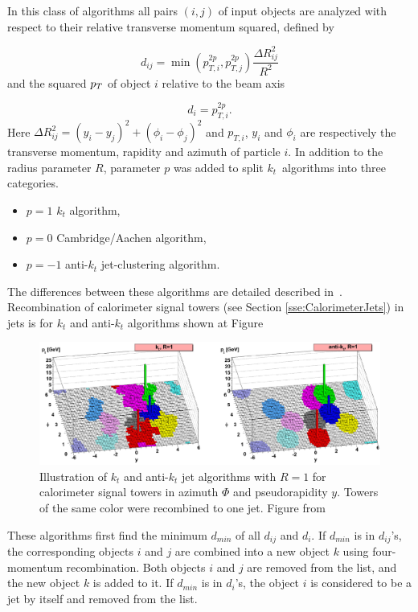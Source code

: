 In this class of algorithms all pairs $(i,j)$ of input objects are analyzed with
respect to their relative transverse momentum squared, defined by 

\begin{equation}
	d_{ij} = \min{\left( p_{T,i}^{2p} , p_{T,j}^{2p} \right)} \frac{\Delta R_{ij}^2}{R^2}
\end{equation}
and the squared $p_T$ of object $i$ relative to the beam axis

\begin{equation}
	d_i = p_{T,i}^{2p}.
\end{equation}
Here $\Delta R_{ij}^2 = (y_i - y_j)^2 + (\phi_i - \phi_j)^2$ and $p_{T,i}$,
$y_i$ and $\phi_i$ are respectively the transverse momentum, rapidity and
azimuth of particle $i$. In addition to the radius parameter $R$, parameter $p$
was added to split $k_t$~algorithms into three categories.  
\begin{itemize}
	\item $p = 1$ $k_t$ algorithm,
	\item $p = 0$ Cambridge/Aachen algorithm,
	\item $p = -1$ anti-$k_t$ jet-clustering algorithm.
\end{itemize}
The differences between these algorithms are detailed described
in~\cite{ANTIKT}. Recombination of calorimeter signal towers (see Section
\ref{sse:CalorimeterJets}) in jets is for $k_t$ and anti-$k_t$ algorithms shown
at Figure 

\begin{figure}[t]
  \centering
  \includegraphics[width=\textwidth]{Chapter2/JetRecombination.png}
  \caption{Illustration of $k_t$ and anti-$k_t$ jet algorithms with $R=1$ for
    calorimeter signal towers in azimuth $\Phi$ and pseudorapidity $y$. Towers of
    the same color were recombined to one jet. Figure from
    \cite{JetTheoreticalPictures}} 
  \label{fig:JetRecombination}
\end{figure}

These algorithms first find the minimum $d_{min}$ of all $d_{ij}$ and $d_i$. If
$d_{min}$ is in $d_{ij}$'s, the corresponding objects $i$ and $j$ are combined
into a new object $k$ using four-momentum recombination. Both objects $i$ and
$j$ are removed from the list, and the new object $k$ is added to it. If
$d_{min}$ is in $d_i$'s, the object $i$ is considered to be a jet by itself and
removed from the list.

